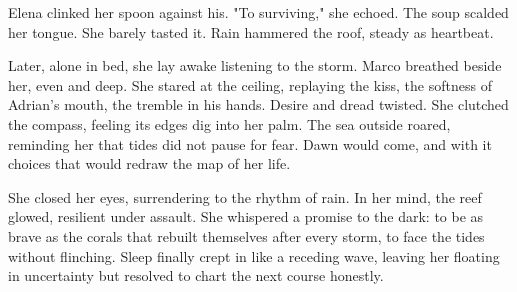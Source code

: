 Elena clinked her spoon against his. "To surviving," she echoed. The soup scalded her tongue. She barely tasted it. Rain hammered the roof, steady as heartbeat.

Later, alone in bed, she lay awake listening to the storm. Marco breathed beside her, even and deep. She stared at the ceiling, replaying the kiss, the softness of Adrian's mouth, the tremble in his hands. Desire and dread twisted. She clutched the compass, feeling its edges dig into her palm. The sea outside roared, reminding her that tides did not pause for fear. Dawn would come, and with it choices that would redraw the map of her life.

She closed her eyes, surrendering to the rhythm of rain. In her mind, the reef glowed, resilient under assault. She whispered a promise to the dark: to be as brave as the corals that rebuilt themselves after every storm, to face the tides without flinching. Sleep finally crept in like a receding wave, leaving her floating in uncertainty but resolved to chart the next course honestly.

